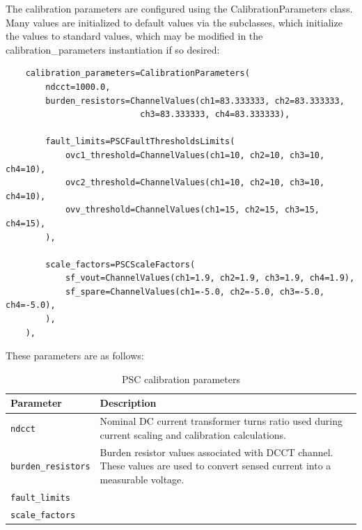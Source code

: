 
\newpage

\label{sec:cal-parameters}
\par\medskip
The calibration parameters are configured using the CalibrationParameters class. Many values are initialized to default values via the subclasses, which initialize the values to standard values, which may be modified in the calibration\_parameters instantiation if so desired:
\begin{verbatim}
	calibration_parameters=CalibrationParameters(
		ndcct=1000.0,
		burden_resistors=ChannelValues(ch1=83.333333, ch2=83.333333,
					       ch3=83.333333, ch4=83.333333),
		
		fault_limits=PSCFaultThresholdsLimits(
			ovc1_threshold=ChannelValues(ch1=10, ch2=10, ch3=10, ch4=10),
			ovc2_threshold=ChannelValues(ch1=10, ch2=10, ch3=10, ch4=10),
			ovv_threshold=ChannelValues(ch1=15, ch2=15, ch3=15, ch4=15),
		),
		
		scale_factors=PSCScaleFactors(
			sf_vout=ChannelValues(ch1=1.9, ch2=1.9, ch3=1.9, ch4=1.9),
			sf_spare=ChannelValues(ch1=-5.0, ch2=-5.0, ch3=-5.0, ch4=-5.0),
		),
	),
\end{verbatim}
These parameters are as follows:\\
\begin{table}[ht]
	\centering
	\begin{tabular}{p{4cm}p{10cm}}
		\toprule
		\textbf{Parameter} & \textbf{Description} \\
		\midrule
		\texttt{ndcct} &
		Nominal DC current transformer turns ratio used during current scaling and calibration calculations. \\
		
		\texttt{burden\_resistors} &
		Burden resistor values associated with DCCT channel. These values are used to convert sensed current into a measurable voltage. \\
		
		\texttt{fault\_limits} &
		\\
		
		\texttt{scale\_factors} &
		\\

		\bottomrule
	\end{tabular}
	\caption{PSC calibration parameters}
	\label{tab:psc-calibration-parameters}
\end{table}

